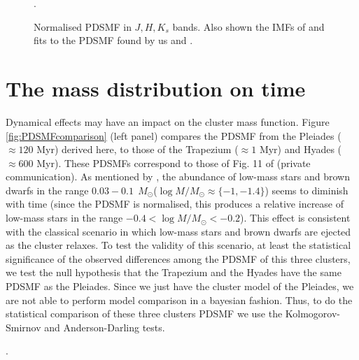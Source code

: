 \begin{figure}[htbp]
\begin{center}
\caption{Normalised PDSMF in $J,H,K_s$ bands. Also shown the IMFs of \citet{Chabrier2005, Thies2007} and fits to the PDSMF found by us and \citet{Bouy2015}.}
\label{fig:MassFunction}.
\end{center}
\end{figure}

\section{The mass distribution on time}
Dynamical effects may have an impact on the cluster mass function. Figure \ref{fig:PDSMFcomparison} (left panel) compares the PDSMF from the Pleiades ($\approx120$ Myr) derived here, to those of the Trapezium ($\approx1$ Myr) and Hyades ($\approx 600$ Myr). These PDSMFs correspond to those of  Fig. 11 of \citet{Bouy2015} (private communication). As mentioned by \citet{Bouy2015}, the abundance of low-mass stars and brown dwarfs in the range $0.03 - 0.1 \ \ M_{\odot}$($\log M/M_{\odot} \approx \{-1, -1.4\}$) seems to diminish with time (since the PDSMF is normalised, this produces a relative increase of low-mass stars in the range $-0.4 < \log M/M_{\odot} < -0.2$). This effect is consistent with the classical scenario in which low-mass stars and brown dwarfs are ejected as the cluster relaxes. To test the validity of this scenario, at least the statistical significance of the observed differences among the PDSMF of this three clusters, we test the null hypothesis that the Trapezium and the Hyades have the same PDSMF as the Pleiades. Since we just have the cluster model of the Pleiades, we are not able to perform model comparison in a bayesian fashion. Thus, to do the statistical comparison of these three clusters PDSMF we use the Kolmogorov-Smirnov and Anderson-Darling tests. 

\begin{figure*}[htp]
\begin{center}
\caption{Left: PDSMFs of the Pleiades (derived here for $J,H,K_s$ bands), Trapezium, and Hyades, from \citet{Bouy2015}. They are normalised in the interval of completeness. Right: Cumulative distribution functions (CDF) of the PDSMFs from left panel and that of \citet{Chabrier2005} and \citet{Thies2007} system initial mass function (normalised also in the interval of completeness). The Pleiades CDF shown is just from $K_s$ band. The grey area depicts the area in which the null hypothesis of same PDSMF as that of the Pleiades can not be rejected (at $\alpha=0.01$).}
\label{fig:PDSMFcomparison}.
\end{center}
\end{figure*}


